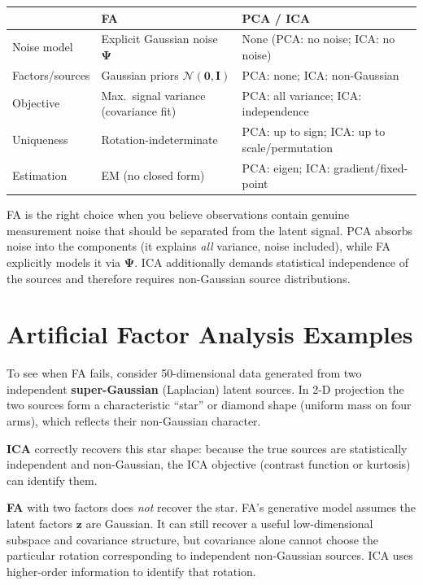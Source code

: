 \documentclass[11pt, oneside]{book}
\begin{document}
\begin{center}
\renewcommand{\arraystretch}{1.25}
\begin{tabular}{lll}
  \toprule
  & \textbf{FA} & \textbf{PCA / ICA} \\
  \midrule
  Noise model & Explicit Gaussian noise $\bm{\Psi}$ & None (PCA: no noise; ICA: no noise) \\
  Factors/sources & Gaussian priors $\mathcal{N}(\bm{0},\bm{I})$ & PCA: none; ICA: non-Gaussian \\
  Objective & Max.\ signal variance (covariance fit) & PCA: all variance; ICA: independence \\
  Uniqueness & Rotation-indeterminate & PCA: up to sign; ICA: up to scale/permutation \\
  Estimation & EM (no closed form) & PCA: eigen; ICA: gradient/fixed-point \\
  \bottomrule
\end{tabular}
\end{center}

\begin{intbox}
  FA is the right choice when you believe observations contain genuine measurement
  noise that should be separated from the latent signal.
  PCA absorbs noise into the components (it explains \emph{all} variance, noise
  included), while FA explicitly models it via $\bm{\Psi}$.
  ICA additionally demands statistical independence of the sources and therefore
  requires non-Gaussian source distributions.
\end{intbox}


\section{Artificial Factor Analysis Examples}

To see when FA fails, consider 50-dimensional data generated from two independent
\textbf{super-Gaussian} (Laplacian) latent sources.
In 2-D projection the two sources form a characteristic ``star'' or diamond
shape (uniform mass on four arms), which reflects their non-Gaussian
character.

\textbf{ICA} correctly recovers this star shape: because the true sources are
statistically independent and non-Gaussian, the ICA objective (contrast function
or kurtosis) can identify them.

\textbf{FA} with two factors does \emph{not} recover the star.
FA's generative model assumes the latent factors $\bm{z}$ are Gaussian. It can still
recover a useful low-dimensional subspace and covariance structure, but covariance alone
cannot choose the particular rotation corresponding to independent non-Gaussian sources.
ICA uses higher-order information to identify that rotation.
\end{document}
